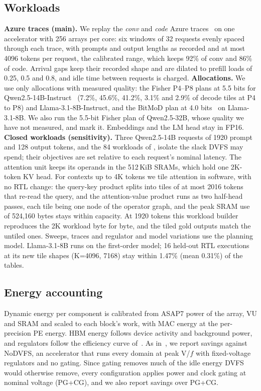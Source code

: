 \subsection{Workloads}
\label{sec:workloads}
\textbf{Azure traces (main).} We replay the \emph{conv} and \emph{code} Azure traces~\cite{splitwise:isca24} on one accelerator with 256 arrays per core: six windows of 32 requests evenly spaced through each trace, with prompts and output lengths as recorded and at most 4096 tokens per request, the calibrated range, which keeps 92\% of conv and 86\% of code. Arrival gaps keep their recorded shape and are dilated to prefill loads of 0.25, 0.5 and 0.8, and idle time between requests is charged.
\textbf{Allocations.} We use only allocations with measured quality: the Fisher P4--P8 plans at 5.5 bits for Qwen2.5-14B-Instruct~\cite{qwen2025qwen25} (7.2\%, 45.6\%, 41.2\%, 3.1\% and 2.9\% of decode tiles at P4 to P8) and Llama-3.1-8B-Instruct, and the BitMoD plan at 4.0 bits~\cite{chen2025bitmod} on Llama-3.1-8B. We also run the 5.5-bit Fisher plan of Qwen2.5-32B, whose quality we have not measured, and mark it. Embeddings and the LM head stay in FP16.
\textbf{Closed workloads (sensitivity).} Three Qwen2.5-14B requests of 1920 prompt and 128 output tokens, and the 84 workloads of , isolate the slack DVFS may spend; their objectives are set relative to each request's nominal latency.
The attention unit keeps its operands in the 512\,KiB SRAMs, which hold one 2K-token KV head. For contexts up to 4K tokens we tile attention in software, with no RTL change: the query-key product splits into tiles of at most 2016 tokens that re-read the query, and the attention-value product runs as two half-head passes, each tile being one node of the operator graph, and the peak SRAM use of 524{,}160 bytes stays within capacity. At 1920 tokens this workload builder reproduces the 2K workload byte for byte, and the tiled gold outputs match the untiled ones.
Sweeps, traces and regulator and model variations use the planning model. Llama-3.1-8B runs on the first-order model; 16 held-out RTL executions at its new tile shapes (K=4096, 7168) stay within 1.47\% (mean 0.31\%) of the tables.

\subsection{Energy accounting}
Dynamic energy per component is calibrated from ASAP7 power of the array, VU and SRAM and scaled to each block's work, with MAC energy at the per-precision PE energy.
HBM energy follows device activity and background power, and regulators follow the efficiency curve of~\cite{xue2026finedvfs}.
As in~\cite{xue2026finedvfs}, we report savings against NoDVFS, an accelerator that runs every domain at peak V/$f$ with fixed-voltage regulators and no gating.
Since gating removes much of the idle energy DVFS would otherwise remove, every configuration applies power and clock gating at nominal voltage (PG+CG), and we also report savings over PG+CG.

